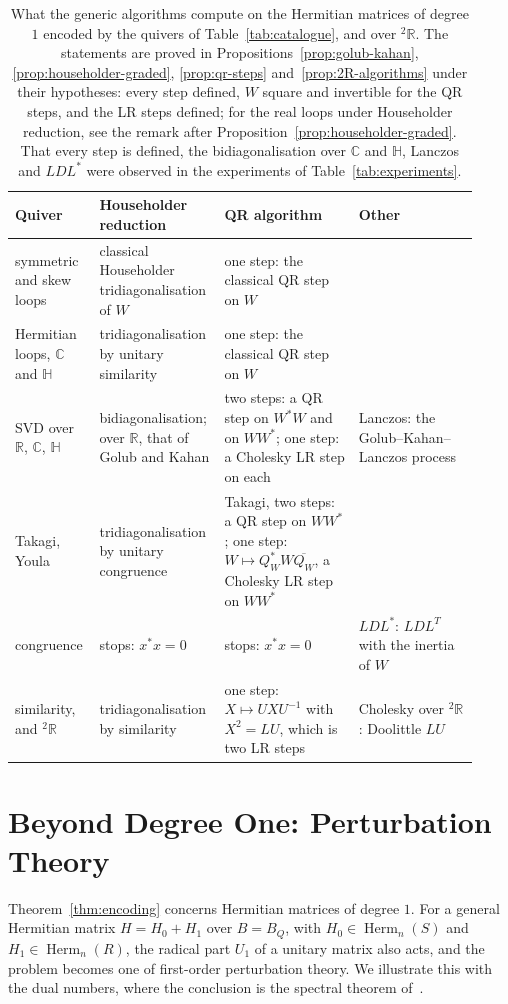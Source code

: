 \documentclass[12pt, a4paper]{report}
\theoremstyle{plain}
\theoremstyle{definition}
\theoremstyle{remark}
\theoremstyle{plain}
\newcommand{\RR}{\mathbb{R}}
\newcommand{\CC}{\mathbb{C}}
\newcommand{\HH}{\mathbb{H}}
\newcommand{\Herm}{\operatorname{Herm}}
\newcommand{\twoR}{{}^{2}\mathbb{R}}
\newcommand{\rowrule}{\arrayrulecolor{black!30}\midrule[0.3pt]\arrayrulecolor{black}}
\begin{document}
\begin{table}[htbp]
\centering
\caption{What the generic algorithms compute on the Hermitian matrices of degree $1$ encoded by the quivers of Table~\ref{tab:catalogue}, and over $\twoR$. The statements are proved in Propositions~\ref{prop:golub-kahan}, \ref{prop:householder-graded}, \ref{prop:qr-steps} and~\ref{prop:2R-algorithms} under their hypotheses: every step defined, $W$ square and invertible for the QR steps, and the LR steps defined; for the real loops under Householder reduction, see the remark after Proposition~\ref{prop:householder-graded}. That every step is defined, the bidiagonalisation over $\CC$ and $\HH$, Lanczos and $LDL^*$ were observed in the experiments of Table~\ref{tab:experiments}.}
\label{tab:algorithms}
\small
\renewcommand{\arraystretch}{1.25}
\begin{tabular}{@{}>{\raggedright\arraybackslash}p{0.17\linewidth}>{\raggedright\arraybackslash}p{0.22\linewidth}>{\raggedright\arraybackslash}p{0.28\linewidth}>{\raggedright\arraybackslash}p{0.25\linewidth}@{}}
\toprule
\textbf{Quiver} & \textbf{Householder reduction} & \textbf{QR algorithm} & \textbf{Other} \\
\midrule
symmetric and skew loops & classical Householder tridiagonalisation of $W$ & one step: the classical QR step on $W$ & \\
\rowrule
Hermitian loops, $\CC$ and $\HH$ & tridiagonalisation by unitary similarity & one step: the classical QR step on $W$ & \\
\rowrule
SVD over $\RR$, $\CC$, $\HH$ & bidiagonalisation; over $\RR$, that of Golub and Kahan & two steps: a QR step on $W^*W$ and on $WW^*$; one step: a Cholesky LR step on each & Lanczos: the \mbox{Golub--Kahan--Lanczos} process \\
\rowrule
Takagi, Youla & tridiagonalisation by unitary congruence & Takagi, two steps: a QR step on $WW^*$; one step: $W\mapsto Q_W^*W\overline{Q_W}$, a Cholesky LR step on $WW^*$ & \\
\rowrule
congruence & stops: $x^*x=0$ & stops: $x^*x=0$ & $LDL^*$: $LDL^T$ with the inertia of $W$ \\
\rowrule
similarity, and $\twoR$ & tridiagonalisation by similarity & one step: $X\mapsto UXU^{-1}$ with $X^2=LU$, which is two LR steps & Cholesky over $\twoR$: Doolittle $LU$ \\
\bottomrule
\end{tabular}
\end{table}

\section{Beyond Degree One: Perturbation Theory}
\label{sec:beyond-radical}
Theorem~\ref{thm:encoding} concerns Hermitian matrices of degree $1$. For a general Hermitian matrix $H=H_0+H_1$ over $B=B_Q$, with $H_0\in\Herm_n(S)$ and $H_1\in\Herm_n(R)$, the radical part $U_1$ of a unitary matrix also acts, and the problem becomes one of first-order perturbation theory. We illustrate this with the dual numbers, where the conclusion is the spectral theorem of~\cite{Gutin2022DualNumbers}.
\end{document}
